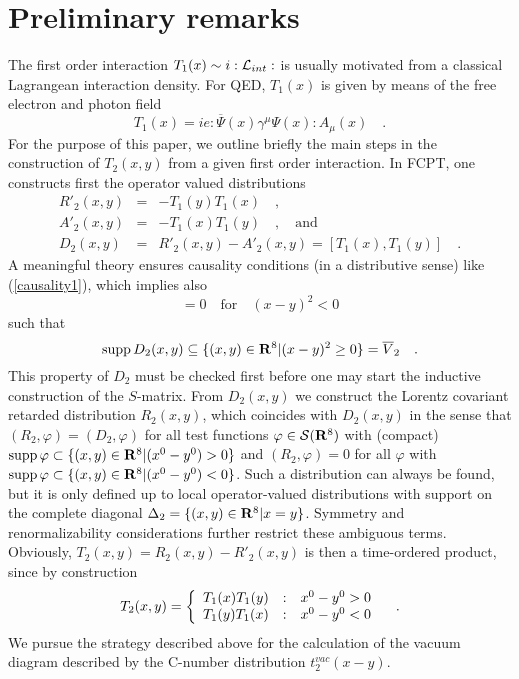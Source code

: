 \documentclass[a4paper,11pt]{article}
\begin{document}
\section{Preliminary remarks}
The first order interaction $T_1(x) \sim i:{\cal{L}}_{int}:$ is
usually motivated from a classical Lagrangean interaction density.
For QED, $T_1(x)$ is given by means of the free electron and photon field
\begin{equation}
T_1(x)=ie:\overline{\Psi}(x) \gamma^\mu \Psi(x): A_\mu(x) \quad .
\end{equation}
For the purpose of this paper, we outline briefly the main steps in the 
construction of $T_{2}(x,y)$ from 
a given  first order interaction.
In FCPT, one constructs first the operator valued distributions
\begin{eqnarray}
R'_2(x,y) &=&-T_1(y)T_1(x) \quad , \\
A'_2(x,y) &=&-T_1(x)T_1(y) \quad , \quad \mbox{and} \\
D_2(x,y)&=&R'_2(x,y)-A'_2(x,y)=[T_1(x),T_1(y)] \quad .
\end{eqnarray}
A meaningful theory ensures causality conditions (in a distributive
sense) like (\ref{causality1}), which implies also
\begin{equation}
[T_1(x),T_1(y)]=0 \quad \mbox{for} \quad (x-y)^2<0
\end{equation}
such that
\begin{equation}
\mbox{supp} \, D_2(x,y) \subseteq \{(x,y) \in {\bf{R}}^8 | (x-y)^2 \geq 0 \}
=\overline{V}_2
\quad .
\end{equation}
This property of $D_2$ must be checked first before one may start the inductive
construction of the $S$-matrix.
From $D_2(x,y)$ we construct the Lorentz covariant retarded distribution
$R_2(x,y)$, which coincides with $D_2(x,y)$ in the sense that
$(R_2, \varphi)=(D_2, \varphi)$ for all test functions
$\varphi \in {\cal{S}}({\bf R}^8)$ with (compact)
$\mbox{supp} \, \varphi \subset \{(x,y) \in {\bf R}^8 | (x^0-y^0) > 0\}$
and $(R_2,\varphi)=0$ for all $\varphi$ with $\mbox{supp} \, \varphi \subset
\{ (x,y) \in {\bf R}^8 | (x^0-y^0) < 0 \}$.
Such a distribution can always be found, but it is only defined up to
local operator-valued distributions with support on the complete diagonal
$\Delta_2=\{(x,y) \in {\bf{R}}^8 | x=y\}$. Symmetry and renormalizability
considerations further restrict these ambiguous terms.
Obviously, $T_2(x,y)=R_2(x,y)-R'_2(x,y)$ is then a time-ordered product,
since by construction
\begin{equation}
T_2(x,y)=\left\{ \begin{array}{r@{\quad:\quad}l}
T_1(x)T_1(y) & x^0-y^0>0 \\
T_1(y)T_1(x) & x^0-y^0 < 0
\end{array} \right. \quad .
\end{equation}
We pursue the strategy described above for the calculation of the vacuum
diagram described by the C-number distribution $t_2^{vac}(x-y)$. 
\end{document}
